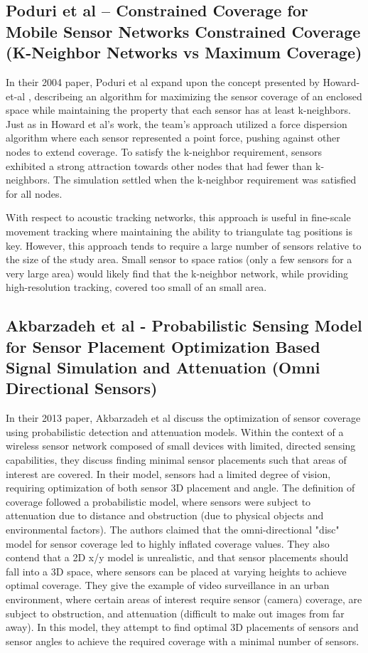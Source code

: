 \subsection{Poduri et al – Constrained Coverage for Mobile Sensor Networks Constrained Coverage (K-Neighbor Networks vs Maximum Coverage)}
In their 2004 paper, Poduri et al\cite{Poduri2004} expand upon the concept presented by Howard-et-al \cite{Howard2002}, describeing an algorithm for maximizing the sensor coverage of an enclosed space while maintaining the property that each sensor has at least k-neighbors. Just as in Howard et al's work, the team's approach utilized a force dispersion algorithm where each sensor represented a point force, pushing against other nodes to extend coverage.  To satisfy the k-neighbor requirement, sensors exhibited a strong attraction towards other nodes that had fewer than k-neighbors.  The simulation settled when the k-neighbor requirement was satisfied for all nodes.  

With respect to acoustic tracking networks, this approach is useful in fine-scale movement tracking where maintaining the ability to triangulate tag positions is key.  However, this approach tends to require a large number of sensors relative to the size of the study area.  Small sensor to space ratios (only a few sensors for a very large area) would likely find that the k-neighbor network, while providing high-resolution tracking, covered too small of an small area.


\subsection{Akbarzadeh et al - Probabilistic Sensing Model for Sensor Placement Optimization Based Signal Simulation and Attenuation (Omni Directional Sensors)}
In their 2013 paper, Akbarzadeh et al\cite{Akbarzadeh2013} discuss the optimization of sensor coverage using probabilistic detection and attenuation models.  Within the context of a wireless sensor network composed of small devices with limited, directed sensing capabilities, they discuss finding minimal sensor placements such that areas of interest are covered.  In their model, sensors had a limited degree of vision, requiring optimization of both sensor 3D placement and angle.  The definition of coverage followed a probabilistic model, where sensors were subject to attenuation due to distance and obstruction (due to physical objects and environmental factors).  The authors claimed that the omni-directional "disc" model for sensor coverage led to highly inflated coverage values.  They also contend that a 2D x/y model is unrealistic, and that sensor placements should fall into a 3D space, where sensors can be placed at varying heights to achieve optimal coverage.  They give the example of video surveillance in an urban environment, where certain areas of interest require sensor (camera) coverage, are subject to obstruction, and attenuation (difficult to make out images from far away).  In this model, they attempt to find optimal 3D placements of sensors and sensor angles to achieve the required coverage with a minimal number of sensors. 

